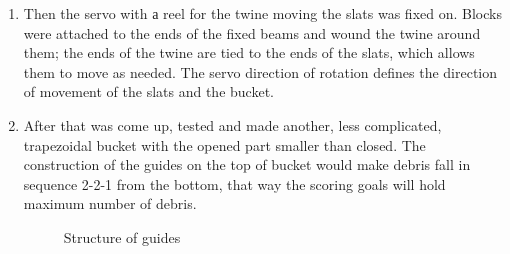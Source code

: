 \begin{enumerate}
  \item Then the servo with а reel for the twine moving the slats was fixed on. Blocks were attached to the ends of the fixed beams and wound the twine around them; the ends of the twine are tied to the ends of the slats, which allows them to move as needed. The servo direction of rotation defines the direction of movement of the slats and the bucket. 	
  
  \item After that was come up, tested and made another, less complicated, trapezoidal bucket with the opened part smaller than closed. The construction of the guides on the top of bucket would make debris fall in sequence 2-2-1 from the bottom, that way the scoring goals will hold maximum number of debris.
  \begin{figure}[h]
  	\begin{minipage}[h]{0.31\linewidth}
  		\caption{Structure of guides}
  	\end{minipage}
  	\hfill
  	\begin{minipage}[h]{0.31\linewidth}

\end{minipage}
\end{figure}
\end{enumerate}
